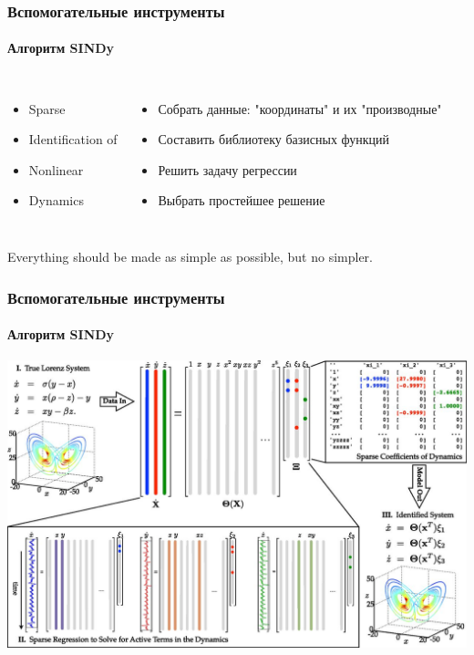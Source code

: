 \documentclass[10pt,pdf,hyperref={unicode}]{beamer}
\begin{document}
			\begin{frame}
				\frametitle{Вспомогательные инструменты} 
				\framesubtitle{Алгоритм SINDy}
				\begin{columns}
					\begin{itemize}
						\item<1-> Sparse
						\item<1-> Identification of
						\item<1-> Nonlinear
						\item<1-> Dynamics
					\end{itemize}
					\begin{itemize}
						\item<2-> Собрать данные: "координаты" и их "производные"
						\item<2-> Составить библиотеку базисных функций
						\item<2-> Решить задачу регрессии
						\item<2-> Выбрать простейшее решение
					\end{itemize}
				\end{columns}
			\pause[3]
			\begin{center}
				\hfill\break
				\hfill\break
				\hfill\break
				\hfill\break
				Everything should be made as simple as possible, but no simpler.
			\end{center}
			\end{frame}
		
			\begin{frame}
				\frametitle{Вспомогательные инструменты} 
				\framesubtitle{Алгоритм SINDy}
				\includegraphics[width=\linewidth]{sindy.jpg}
			\end{frame}
		
\end{document}
